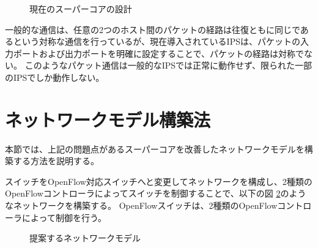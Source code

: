 \begin{figure}[tb]
\begin{center}
\caption{現在のスーパーコアの設計}
\label{fig:3-0}
\end{center}
\end{figure}

一般的な通信は、任意の2つのホスト間のパケットの経路は往復ともに同じであるという対称な通信を行っているが、現在導入されているIPSは、パケットの入力ポートおよび出力ポートを明確に設定することで、パケットの経路は対称でない。
このようなパケット通信は一般的なIPSでは正常に動作せず、限られた一部のIPSでしか動作しない。

\section{ネットワークモデル構築法}

本節では、上記の問題点があるスーパーコアを改善したネットワークモデルを構築する方法を説明する。

スイッチをOpenFlow対応スイッチへと変更してネットワークを構成し、2種類のOpenFlowコントローラによってスイッチを制御することで、以下の図 \ref{fig:3-1}のようなネットワークを構築する。
OpenFlowスイッチは、2種類のOpenFlowコントローラによって制御を行う。

\begin{figure}[tb]
\begin{center}
\caption{提案するネットワークモデル}
\label{fig:3-1}
\end{center}
\end{figure}

